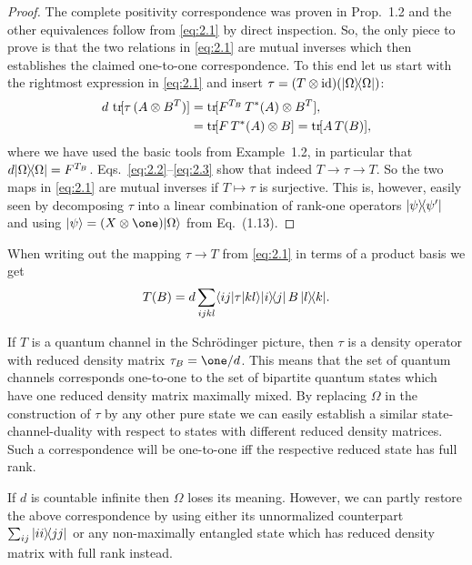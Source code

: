 \documentclass[11pt,a4paper]{article}
\numberwithin{equation}{section}
\theoremstyle{plain}
\theoremstyle{definition}
\begin{document}
\begin{proof}
    The complete positivity correspondence was proven in Prop.~1.2 and the other
    equivalences follow from \eqref{eq:2.1} by direct inspection. So, the only piece to
    prove is that the two relations in \eqref{eq:2.1} are mutual inverses which then
    establishes the claimed one-to-one correspondence. To this end let us start with the
    rightmost expression in \eqref{eq:2.1} and insert $\tau=(T\otimes \mathrm{id})(|\Omega\rangle\!\langle\Omega|)$:
    \begin{align}
        d\,\operatorname{tr}\![\tau\,(A \otimes B^{T})]
         &= \operatorname{tr}\![F^{T_B}\,T^*(A)\otimes B^{T}], \label{eq:2.2}\\
         &= \operatorname{tr}\![F\,T^*(A)\otimes B]
        = \operatorname{tr}\![A\,T(B)], \label{eq:2.3}
    \end{align}
    where we have used the basic tools from Example~1.2, in particular that
    $d|\Omega\rangle\!\langle\Omega|=F^{T_B}$. Eqs.~\eqref{eq:2.2}--\eqref{eq:2.3} show that
    indeed $T \to \tau \to T$. So the two maps in \eqref{eq:2.1} are mutual inverses if
    $T \mapsto \tau$ is surjective. This is, however, easily seen by decomposing $\tau$
    into a linear combination of rank-one operators $|\psi\rangle\!\langle\psi'|$ and using
    $\ket{\psi}=(X\otimes \one)\ket{\Omega}$ from Eq.~(1.13).
\end{proof}

When writing out the mapping $\tau \to T$ from \eqref{eq:2.1} in terms of a product
basis we get
\begin{equation}\label{eq:2.4}
    T(B) = d \sum_{i j k l} \langle ij|\tau|kl\rangle  |i\rangle\!\langle j|\,B\,|l\rangle\!\langle k|.
\end{equation}

If $T$ is a quantum channel in the Schr\"odinger picture, then $\tau$ is a density
operator with reduced density matrix $\tau_B = \one/d$. This means that the
set of quantum channels corresponds one-to-one to the set of bipartite quantum
states which have one reduced density matrix maximally mixed. By replacing $\Omega$
in the construction of $\tau$ by any other pure state we can easily establish a
similar state-channel-duality with respect to states with different reduced density
matrices. Such a correspondence will be one-to-one iff the respective reduced state
has full rank.

If $d$ is countable infinite then $\Omega$ loses its meaning. However, we can partly
restore the above correspondence by using either its unnormalized counterpart
$\sum_{ij}|ii\rangle\!\langle jj|$ or any non-maximally entangled state which has reduced
density matrix with full rank instead.
\end{document}
